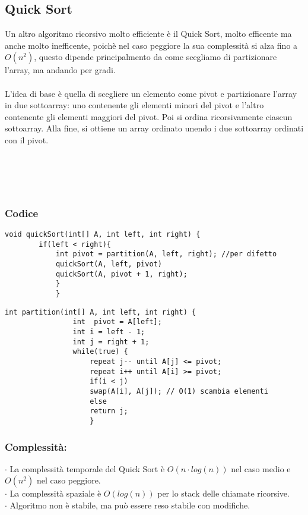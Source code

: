 \documentclass[a4paper,12pt]{article}
\begin{document}
\subsection{Quick Sort}
Un altro algoritmo ricorsivo molto efficiente è il Quick Sort, molto efficente ma anche molto inefficente, poichè nel caso peggiore la sua complessità si alza fino a $O(n^2)$, questo dipende principalmento da come scegliamo di partizionare l'array, ma andando per gradi.\\ \\
L'idea di base è quella di scegliere un elemento come pivot e partizionare l'array in due sottoarray: uno contenente gli elementi minori del pivot e l'altro contenente gli elementi maggiori del pivot. Poi si ordina ricorsivamente ciascun sottoarray. Alla fine, si ottiene un array ordinato unendo i due sottoarray ordinati con il pivot.\\ \\ \\ \\ \\ 
\subsubsection{{\textcolor{codice}{Codice}}}
\begin{lstlisting}[style=mystyle]
    void quickSort(int[] A, int left, int right) {
        if(left < right){
            int pivot = partition(A, left, right); //per difetto
            quickSort(A, left, pivot)
            quickSort(A, pivot + 1, right);
            }
            }
        \end{lstlisting}
        
        \begin{lstlisting}[style=mystyle]
            int partition(int[] A, int left, int right) {
                int  pivot = A[left];
                int i = left - 1;
                int j = right + 1;
                while(true) {
                    repeat j-- until A[j] <= pivot;
                    repeat i++ until A[i] >= pivot;
                    if(i < j)
                    swap(A[i], A[j]); // O(1) scambia elementi
                    else
                    return j;
                    }
                \end{lstlisting}
                
                \subsubsection*{{\textcolor{teorema}{Complessità: }}}
                $\cdot $ La complessità temporale del Quick Sort è $O(n \cdot log(n))$ nel caso medio e $O(n^2)$ nel caso peggiore. \\
                $\cdot $ La complessità spaziale è $O(log(n))$ per lo stack delle chiamate ricorsive. \\
                $\cdot $ Algoritmo non è stabile, ma può essere reso stabile con modifiche.
                
\end{document}
